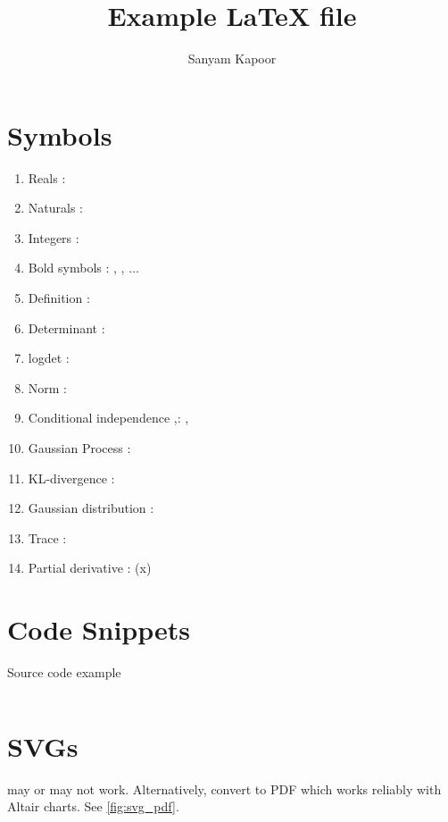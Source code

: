 \documentclass{article}
\title{Example \LaTeX{ }file}
\author{Sanyam Kapoor}
\begin{document}
\maketitle

\section{Symbols}

\begin{enumerate}%
\item Reals \vrb{\reals}: \reals
\item Naturals \vrb{\naturals}: \naturals
\item Integers \vrb{\ints}: \ints
\item Bold symbols \vrb{\mbf{}}: \mbf{\Sigma}, , $\dots$
\item Definition : 
\item Determinant \vrb{\determ{}}: \determ{\cdot}
\item logdet \vrb{\logdet{}}: \logdet{\cdot}
\item Norm \vrb{\norm{}}: \norm{\cdot}
\item Conditional independence \vrb{\ci},\vrb{\nci}: \ci, \nci
\item Gaussian Process \vrb{\gp}: \gp
\item KL-divergence \vrb{\kl}: \kl
\item Gaussian distribution \vrb{\gaussian{}}: \gaussian{\cdot, \cdot}
\item Trace \vrb{\tr{}}: \tr{\cdot}
\item Partial derivative \vrb{\pd{}{}}: (x)
\end{enumerate}

\section{Code Snippets}

\begin{code}
\caption{Source code example} \label{code:sample}
\inputminted[firstline=1,lastline=2,fontsize=\small]{python}{test.py}
\end{code}

\section{SVGs}

\vrb{} may or may not work. Alternatively, convert to PDF which works reliably with Altair charts. See \cref{fig:svg_pdf}.
\end{document}
